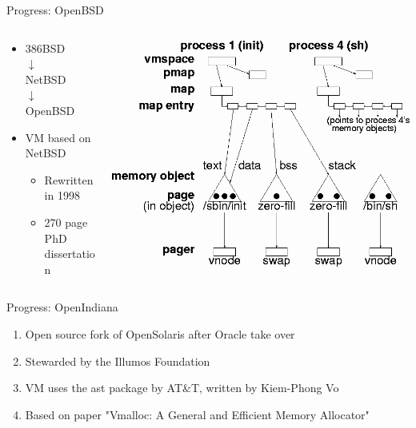 \documentclass[aspectratio=169]{beamer}
\newcommand{\bi}{\begin{itemize}}
\newcommand{\ei}{\end{itemize}}
\begin{document}
\begin{frame}{Progress: OpenBSD}
  \begin{columns}[T]
    \begin{column}{0.4\textwidth}
      \bi
    \item 386BSD\\$\downarrow$\\NetBSD\\$\downarrow$\\OpenBSD
      \pause
    \item VM based on NetBSD
      \pause
      \bi
    \item Rewritten in 1998
      \pause
    \item 270 page PhD dissertation
      \pause
      \ei
      \ei
    \end{column}
    \begin{column}{0.6\textwidth}
      \includegraphics[scale=0.35]{./figures/uvm.png}
    \end{column}
  \end{columns}
\end{frame}

\begin{frame}{Progress: OpenIndiana}
    \begin{enumerate}
        \item Open source fork of OpenSolaris after Oracle take over
        \item Stewarded by the Illumos Foundation
        \item VM uses the ast package by AT\&T, written by Kiem-Phong Vo
        \item Based on paper "Vmalloc: A General and Efficient Memory Allocator"
    \end{enumerate}
\end{frame}
\end{document}
